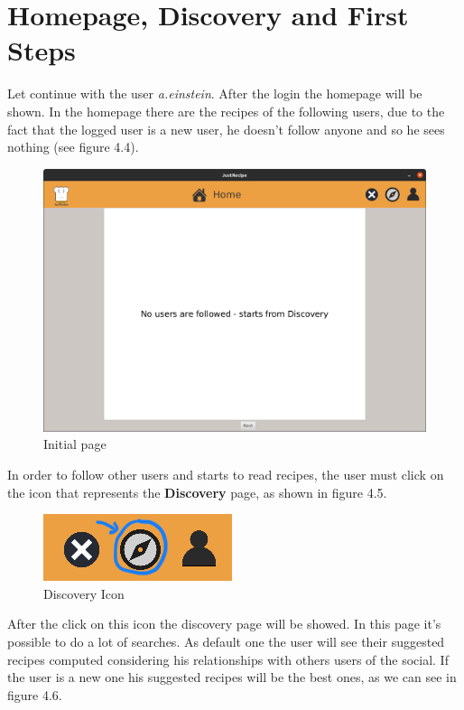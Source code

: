 \documentclass[a4paper]{report}
\begin{document}
\newpage
\section{Homepage, Discovery and First Steps}
Let continue with the user \emph{a.einstein}. After the login the homepage will be shown. In the homepage there are the recipes of the following users, due to the fact that the logged user is a new user, he doesn't follow anyone and so he sees nothing (see figure 4.4).

\begin{figure}[htpb]
	\centering
	\includegraphics[scale=0.25]{img/user_manual/blank-homepage.png}
	\caption{Initial page}
\end{figure}

\noindent In order to follow other users and starts to read recipes, the user must click on the icon that represents the \textbf{Discovery} page, as shown in figure 4.5.

\begin{figure}[htpb]
	\centering
	\includegraphics[scale=0.3]{img/user_manual/discovery-icon.png}
	\caption{Discovery Icon}
\end{figure}

\noindent After the click on this icon the discovery page will be showed. In this page it's possible to do a lot of searches. As default one the user will see their suggested recipes computed considering his relationships with others users of the social. If the user is a new one his suggested recipes will be the best ones, as we can see in figure 4.6.
\end{document}
